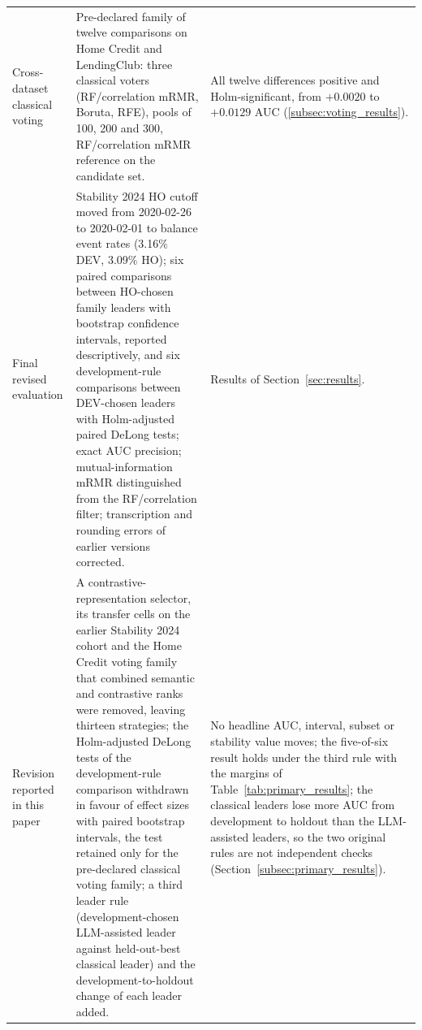 \documentclass[final,5p,twocolumn]{elsarticle}
\providecommand{\DIFaddendFL}{} %
\begin{document}
\begin{table}[htbp]
\begin{threeparttable}
\begin{tabular}{@{}L{27mm}L{\dimexpr(\textwidth-27mm-4\tabcolsep)/2\relax}L{\dimexpr(\textwidth-27mm-4\tabcolsep)/2\relax}@{}}
\addlinespace
Cross-dataset classical voting & Pre-declared family of twelve comparisons on Home Credit and LendingClub: three classical voters (RF/correlation mRMR, Boruta, RFE), pools of 100, 200 and 300, RF/correlation mRMR reference on the candidate set. & All twelve differences positive and Holm-significant, from $+0.0020$ to $+0.0129$ AUC (\ref{subsec:voting_results}). \\
\addlinespace
Final revised evaluation & Stability 2024 HO cutoff moved from 2020-02-26 to 2020-02-01 to balance event rates (3.16\% DEV, 3.09\% HO); six paired comparisons between HO-chosen family leaders with bootstrap confidence intervals, reported descriptively, and six development-rule comparisons between DEV-chosen leaders with Holm-adjusted paired DeLong tests; exact AUC precision; mutual-information mRMR distinguished from the RF/correlation filter; transcription and rounding errors of earlier versions corrected. & Results of Section~\ref{sec:results}. \\
\addlinespace
Revision reported in this paper & A contrastive-representation selector, its transfer cells on the earlier Stability 2024 cohort and the Home Credit voting family that combined semantic and contrastive ranks were removed, leaving thirteen strategies; the Holm-adjusted DeLong tests of the development-rule comparison withdrawn in favour of effect sizes with paired bootstrap intervals, the test retained only for the pre-declared classical voting family; a third leader rule (development-chosen LLM-assisted leader against held-out-best classical leader) and the development-to-holdout change of each leader added. & No headline AUC, interval, subset or stability value moves; the five-of-six result holds under the third rule with the margins of Table~\ref{tab:primary_results}; the classical leaders lose more AUC from development to holdout than the LLM-assisted leaders, so the two original rules are not independent checks (Section~\ref{subsec:primary_results}). \\
\bottomrule
\end{tabular}
\DIFaddendFL \end{threeparttable}
\end{table}
\end{document}
